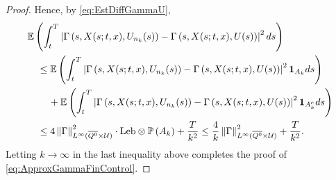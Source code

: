 \documentclass[amscd,amssymb,11pt]{article}
\numberwithin{theorem}{section}
\numberwithin{equation}{section}
\begin{document}
\begin{proof}
Hence, by \eqref{eq:EstDiffGammaU},
\begin{align*}
&\mathbb{E}\left(\int_{t}^{T}\left|\Gamma\left(s,X(s;t,x),U_{n_{k}}(s)\right)-\Gamma\left(s,X(s;t,x),U(s)\right)\right|^{2}ds\right)\\
&\quad\leq\mathbb{E}\left(\int_{t}^{T}\left|\Gamma\left(s,X(s;t,x),U_{n_{k}}(s)\right)-\Gamma\left(s,X(s;t,x),U(s)\right)\right|^{2}{\bf 1}_{A_{k}}ds\right)\\
&\qquad\,+\mathbb{E}\left(\int_{t}^{T}\left|\Gamma\left(s,X(s;t,x),U_{n_{k}}(s)\right)-\Gamma\left(s,X(s;t,x),U(s)\right)\right|^{2}{\bf 1}_{A_{k}^{c}}ds\right)\\
&\quad\leq 4\left\|\Gamma\right\|_{L^{\infty}(\overline{Q^{0}}\times\mathcal{U})}^{2}\cdot\text{Leb}\otimes\mathbb{P}\left(A_{k}\right)+\frac{T}{k^{2}}\leq\frac{4}{k}\left\|\Gamma\right\|_{L^{\infty}(\overline{Q^{0}}\times\mathcal{U})}^{2}+\frac{T}{k^{2}}.
\end{align*}
Letting $k\rightarrow\infty$ in the last inequality above completes the proof of \eqref{eq:ApproxGammaFinControl}.


\end{proof}
\end{document}
